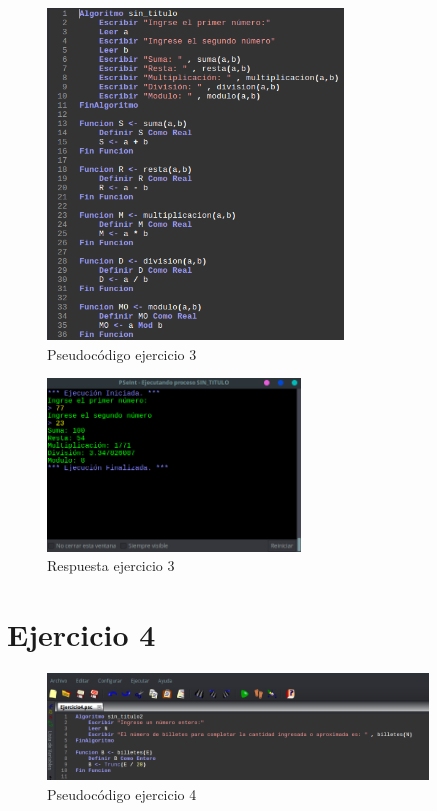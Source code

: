 \documentclass[11pt, a4paper]{report}
\begin{document}
\begin{figure}[!ht]
\begin{center}
  \includegraphics[width=0.7\textwidth]{ejercicio3.png}
  \caption{Pseudoc\'odigo ejercicio 3}
\end{center}
\end{figure}

\begin{figure}[!ht]
\begin{center}
  \includegraphics[width=0.6\textwidth]{respuesta4.png}
  \caption{Respuesta ejercicio 3}
\end{center}
\end{figure} 

\newpage
\section*{Ejercicio 4}

\begin{figure}[!ht]
\begin{center}
  \includegraphics[width=0.9\textwidth]{ejercicio4.png}
  \caption{Pseudoc\'odigo ejercicio 4}
\end{center}
\end{figure}
\end{document}
